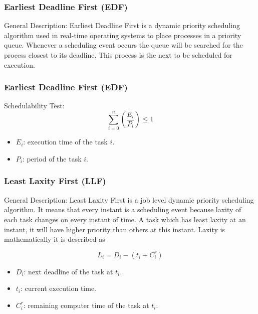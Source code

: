 \documentclass[xcolor=table]{beamer}
\begin{document}
\begin{frame}
\frametitle{Earliest Deadline First (\textbf{EDF})}

\begin{alertblock}{General Description:}
Earliest Deadline First is a dynamic priority scheduling algorithm used in real-time operating systems to place processes in a priority queue. Whenever a scheduling event occurs the queue will be searched for the process closest to its deadline. This process is the next to be scheduled for execution.
\end{alertblock}

\end{frame}

\begin{frame}
\frametitle{Earliest Deadline First (\textbf{EDF})}

\begin{block}{Schedulability Test:}
\begin{equation}
\sum_{i=0}^{n} \left( \frac{E_i}{P_i} \right) \leq 1
\end{equation}

\begin{itemize}
    \item $E_i$: execution time of the task $i$.
    \item $P_i$: period of the task $i$.
\end{itemize}
\end{block}

\end{frame}

\begin{frame}
\frametitle{Least Laxity First (\textbf{LLF})}

\begin{alertblock}{General Description:}
Least Laxity First  is a job level dynamic priority scheduling algorithm. It means that every instant is a scheduling event because laxity of each task changes on every instant of time. A task which has least laxity at an instant, it will have higher priority than others at this instant. Laxity is mathematically it is described as

\begin{equation}
    L_i = D_i - (t_i + C^r_i)
\end{equation}

\begin{itemize}
    \item $D_i$: next deadline of the task at $t_i$.
    \item $t_i$: current execution time.
    \item $C^r_i$: remaining computer time of the task at $t_i$.
\end{itemize}
\end{alertblock}

\end{frame}
\end{document}
